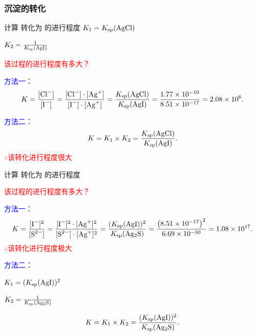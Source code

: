         \subsubsection{沉淀的转化}\label{subsubsec:沉淀的转化}

            \begin{xmp}{计算  转化为  的进行程度}
                 \(K_1 = K_\text{sp}(\cemh{AgCl})\)

                 \(K_2 = \frac{1}{K_\text{sp}(\cemh{AgI})}\)


                \textcolor{red}{该过程的进行程度有多大？}

                \textcolor{blue}{方法一}：
                \[
                    K = \frac{\cemh{[Cl^-]}}{\cemh{[I^-]}} = \frac{\cemh{[Cl^-]}\cdot\cemh{[Ag+]}}{\cemh{[I^-]}\cdot\cemh{[Ag+]}} = \frac{K_\text{sp}(\cemh{AgCl})}{K_\text{sp}(\cemh{AgI})} = \frac{\num{1.77E-10}}{\num{8.51E-17}} = \num{2.08E6}
                .\]

                \textcolor{blue}{方法二}：
                \[
                    K = K_1 \times K_2 = \frac{K_\text{sp}(\cemh{AgCl})}{K_\text{sp}(\cemh{AgI})}
                .\]
                \textcolor{red}{\(\therefore\)该转化进行程度很大}
            \end{xmp}

            \begin{xmp}{计算  转化为  的进行程度}

                \textcolor{red}{该过程的进行程度有多大？}

                \textcolor{blue}{方法一}：
                \[
                    K = \frac{\cemh{[I^-]}^2}{\cemh{[S^{2-}]}} = \frac{\cemh{[I^-]}^2\cdot\cemh{[Ag+]}^2}{\cemh{[S^{2-}]}\cdot\cemh{[Ag+]}^2} = \frac{(K_\text{sp}(\cemh{AgI}))^2}{K_\text{sp}(\cemh{Ag2S})} = \frac{\left(\num{8.51E-17}\right)^2}{\num{6.69E-50}} = \num{1.08E17}
                .\]
                \textcolor{red}{\(\therefore\)该转化进行程度极大}

                \textcolor{blue}{方法二}：

                 \(K_1 = (K_\text{sp}(\cemh{AgI}))^2\)

                 \(K_2 = \frac{1}{K_\text{sp}(\cemh{Ag2S})}\)

                \[
                    K = K_1 \times K_2 = \frac{(K_\text{sp}(\cemh{AgI}))^2}{K_\text{sp}(\cemh{Ag2S})}
                .\]
            \end{xmp}

